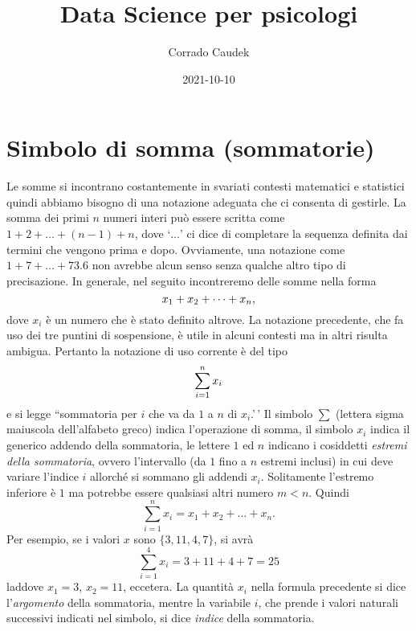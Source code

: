 \documentclass[
]{memoir}
\title{Data Science per psicologi}
\author{Corrado Caudek}
\date{2021-10-10}
\theoremstyle{definition}
\theoremstyle{definition}
\theoremstyle{definition}
\theoremstyle{definition}
\theoremstyle{remark}
\begin{document}
\maketitle

{
\hypersetup{linkcolor=}
\setcounter{tocdepth}{1}
\tableofcontents
}
\newpage

\vspace*{5cm}

\thispagestyle{empty}

\hypertarget{sommatorie}{%
\chapter{Simbolo di somma (sommatorie)}\label{sommatorie}}

Le somme si incontrano costantemente in svariati contesti matematici e statistici quindi abbiamo bisogno di una notazione adeguata che ci consenta di gestirle. La somma dei primi \(n\) numeri interi può essere scritta come \(1+2+\dots+(n-1)+n\), dove `\(\dots\)' ci dice di completare la sequenza definita dai termini che vengono prima e dopo. Ovviamente, una notazione come \(1+7+\dots+73.6\) non avrebbe alcun senso senza qualche altro tipo di precisazione. In generale, nel seguito incontreremo delle somme nella forma
\begin{equation}
x_1+x_2+\dots+x_n,\notag
\end{equation}
dove \(x_i\) è un numero che è stato definito altrove. La notazione precedente, che fa uso dei tre puntini di sospensione, è utile in alcuni contesti ma in altri risulta ambigua. Pertanto la notazione di uso corrente è del tipo
\begin{equation}
  \sum_{i=1}^n x_i\notag
\end{equation}
\noindent
e si legge ``sommatoria per \(i\) che va da \(1\) a \(n\) di \(x_i\).'\,' Il simbolo \(\sum\) (lettera sigma maiuscola dell'alfabeto greco) indica l'operazione di somma, il simbolo \(x_i\) indica il generico addendo della sommatoria, le lettere \(1\) ed \(n\) indicano i cosiddetti \emph{estremi della sommatoria}, ovvero l'intervallo (da \(1\) fino a \(n\) estremi inclusi) in cui deve variare l'indice \(i\) allorché si sommano gli addendi \(x_i\).
Solitamente l'estremo inferiore è \(1\) ma potrebbe essere qualsiasi altri numero \(m < n\). Quindi
\[
  \sum_{i=1}^n x_i = x_1 + x_{2} + \dots + x_{n}.
\]
Per esempio, se i valori \(x\) sono \(\{3, 11, 4, 7\}\), si avrà
\[
  \sum_{i=1}^4 x_i = 3+11+4+7 = 25 
\]
laddove \(x_1 = 3\), \(x_2 = 11\), eccetera. La quantità \(x_i\) nella formula precedente si dice l'\emph{argomento} della sommatoria, mentre la variabile \(i\), che prende i valori naturali successivi indicati nel simbolo, si dice \emph{indice} della sommatoria.
\end{document}
